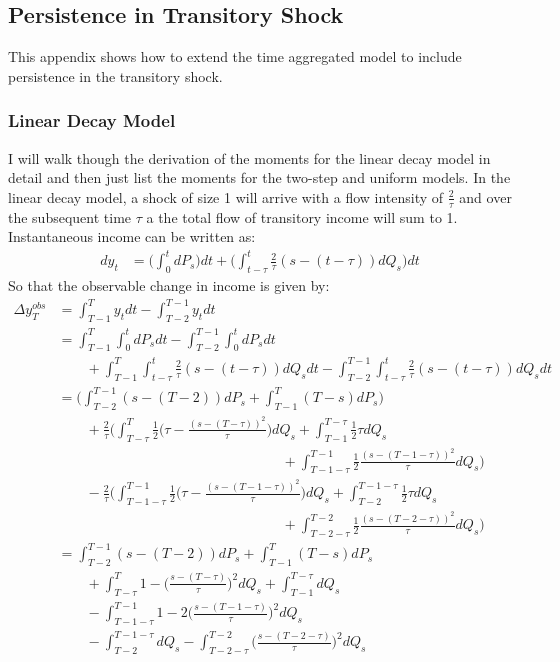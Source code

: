 \subsection{Persistence in Transitory Shock} \label{persistence_appendix}
This appendix shows how to extend the time aggregated model to include persistence in the transitory shock.

\subsubsection{Linear Decay Model}
I will walk though the derivation of the moments for the linear decay model in detail and then just list the moments for the two-step and uniform models. In the linear decay model, a shock of size 1 will arrive with a flow intensity of $\frac{2}{\tau}$ and over the subsequent time $\tau$ a the total flow of transitory income will sum to 1. Instantaneous income can be written as:
 \begin{align*}
dy_t &= \Big(\int_{0}^{t} dP_s \Big) dt +\Big(\int_{t-\tau}^{t} \frac{2}{\tau}(s-(t-\tau)) dQ_s \Big)dt
 \end{align*}
So that the observable change in income is given by:
\begin{align}
\Delta y^{obs}_T &= \int_{T-1}^{T} y_t dt - \int_{T-2}^{T-1} y_t dt \nonumber \\ 
&= \int_{T-1}^{T} \int_{0}^{t}dP_s dt -\int_{T-2}^{T-1} \int_{0}^{t}dP_s dt \nonumber \\
& \qquad +  \int_{T-1}^{T} \int_{t-\tau}^{t} \frac{2}{\tau}(s-(t-\tau)) dQ_s dt -\int_{T-2}^{T-1}\int_{t-\tau}^{t} \frac{2}{\tau}(s-(t-\tau)) dQ_s dt \nonumber \\
&= \Big(\int_{T-2}^{T-1} (s-(T-2))dP_s  + \int_{T-1}^{T} (T-s)dP_s \Big) \nonumber \\
&  \qquad +\frac{2}{\tau} \Big(\int_{T-\tau}^{T} \frac{1}{2}\Big(\tau - \frac{(s-(T-\tau))^2}{\tau} \Big)dQ_s  +\int_{T-1}^{T-\tau} \frac{1}{2}\tau dQ_s \\
& \qquad \qquad \qquad \qquad \qquad \qquad \qquad \qquad +\int_{T-1-\tau}^{T-1} \frac{1}{2}\frac{(s-(T-1-\tau))^2}{\tau} dQ_s \Big) \nonumber \\
& \qquad -\frac{2}{\tau}  \Big(\int_{T-1-\tau}^{T-1} \frac{1}{2}\Big(\tau - \frac{(s-(T-1-\tau))^2}{\tau} \Big)dQ_s  +\int_{T-2}^{T-1-\tau} \frac{1}{2}\tau dQ_s \nonumber \\
& \qquad \qquad \qquad \qquad \qquad \qquad \qquad \qquad  +\int_{T-2-\tau}^{T-2} \frac{1}{2}\frac{(s-(T-2-\tau))^2}{\tau} dQ_s \Big) \nonumber \\
&= \int_{T-2}^{T-1} (s-(T-2))dP_s  + \int_{T-1}^{T} (T-s)dP_s  \nonumber \\
&  \qquad +\int_{T-\tau}^{T} 1 - \Big(\frac{s-(T-\tau)}{\tau}\Big)^2 dQ_s  +\int_{T-1}^{T-\tau}  dQ_s   \nonumber \\
& \qquad - \int_{T-1-\tau}^{T-1} 1 - 2\Big(\frac{s-(T-1-\tau)}{\tau}\Big)^2 dQ_s \nonumber \\
& \qquad-  \int_{T-2}^{T-1-\tau}  dQ_s  -\int_{T-2-\tau}^{T-2} \Big(\frac{s-(T-2-\tau)}{\tau}\Big)^2 dQ_s 
\end{align}
